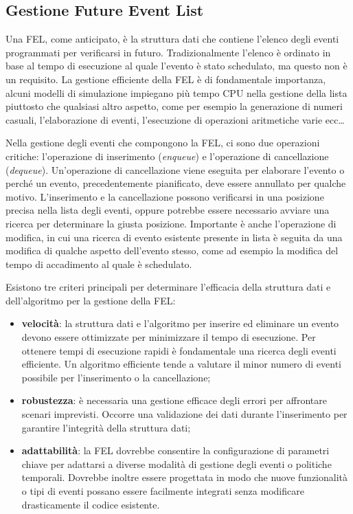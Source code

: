 \documentclass[12pt,a4paper,openright,twoside]{book}
\begin{document}
\subsection{Gestione Future Event List}
Una FEL, come anticipato, è la struttura dati che contiene l'elenco degli eventi programmati per verificarsi in futuro. Tradizionalmente l'elenco è ordinato in base al tempo di esecuzione al quale l'evento è stato schedulato, ma questo non è un requisito. 
La gestione efficiente della FEL è di fondamentale importanza, alcuni modelli di simulazione impiegano più tempo CPU nella gestione della lista piuttosto che qualsiasi altro aspetto, come per esempio la generazione di numeri casuali, l'elaborazione di eventi, l'esecuzione di operazioni aritmetiche varie ecc\dots

Nella gestione degli eventi che compongono la FEL, ci sono due operazioni critiche: l'operazione di inserimento (\textit{enqueue}) e l'operazione di cancellazione (\textit{dequeue}). Un'operazione di cancellazione viene eseguita per elaborare l'evento o perché un evento, precedentemente pianificato, deve essere annullato per qualche motivo. L'inserimento e la cancellazione possono verificarsi in una posizione precisa nella lista degli eventi, oppure potrebbe essere necessario avviare una ricerca per determinare la giusta posizione. 
Importante è anche l'operazione di modifica, in cui una ricerca di evento esistente presente in lista è seguita da una modifica di qualche aspetto dell'evento stesso, come ad esempio la modifica del tempo di accadimento al quale è schedulato. 

Esistono tre criteri principali per determinare l'efficacia della struttura dati e dell'algoritmo per la gestione della FEL: 
\begin{itemize}
    \item \textbf{velocità}: la struttura dati e l'algoritmo per inserire ed eliminare un evento devono essere ottimizzate per minimizzare il tempo di esecuzione. Per ottenere tempi di esecuzione rapidi è fondamentale una ricerca degli eventi efficiente. Un algoritmo efficiente tende a valutare il minor numero di eventi possibile per l'inserimento o la cancellazione;
    \item  \textbf{robustezza}: è necessaria una gestione efficace degli errori per affrontare scenari imprevisti. Occorre una validazione dei dati durante l'inserimento per garantire l'integrità della struttura dati; 
    \item \textbf{adattabilità}: la FEL dovrebbe consentire la configurazione di parametri chiave per adattarsi a diverse modalità di gestione degli eventi o politiche temporali. Dovrebbe inoltre essere progettata in modo che nuove funzionalità o tipi di eventi possano essere facilmente integrati senza modificare drasticamente il codice esistente. 
\end{itemize}
\end{document}
